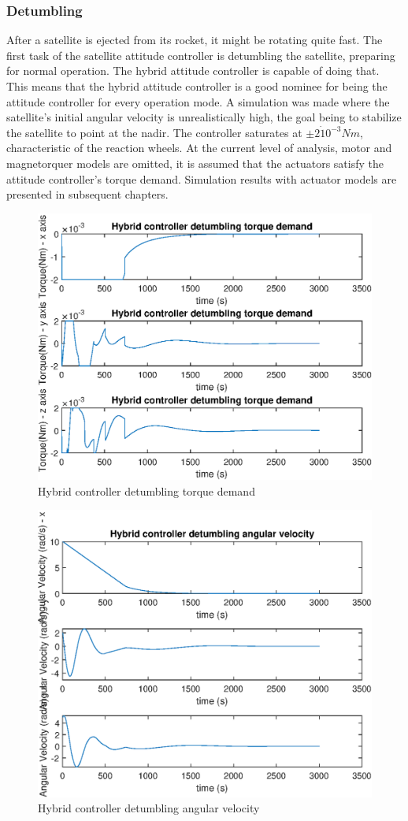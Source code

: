 \subsubsection{Detumbling}

After a satellite is ejected from its rocket, it might be rotating quite fast. The first task of the satellite attitude controller is detumbling the satellite, preparing for normal operation. The hybrid attitude controller is capable of doing that. This means that the hybrid attitude controller is a good nominee for being the attitude controller for every operation mode. A simulation was made where the satellite's initial angular velocity is unrealistically high, the goal being to stabilize the satellite to point at the nadir. The controller saturates at $\pm 2 \dot 10^{-3} Nm$, characteristic of the reaction wheels. At the current level of analysis, motor and magnetorquer models are omitted, it is assumed that the actuators satisfy the attitude controller's torque demand. Simulation results with actuator models are presented in subsequent chapters.

\begin{figure}[H]
	\centering
	\includegraphics[width=0.7\linewidth]{figures/detumbling}
	\caption{Hybrid controller detumbling torque demand}
	\label{fig:detumbling}
\end{figure}

\begin{figure}[H]
	\centering
	\includegraphics[width=0.7\linewidth]{figures/detumbling3}
	\caption{Hybrid controller detumbling angular velocity}
	\label{fig:omega}
\end{figure}

